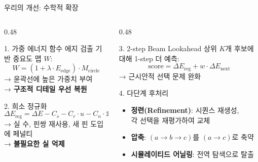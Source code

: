\documentclass[10pt,aspectratio=169]{beamer}
\begin{document}
\begin{frame}{우리의 개선: 수학적 확장}
  \begin{columns}[T]
    \begin{column}{0.48\textwidth}
      \begin{block}{1. 가중 에너지 함수}
        에지 검출 기반 중요도 맵 $W$:
        \[
          W = (1 + \lambda \cdot E_{\text{edge}}) \cdot M_{\text{circle}}
        \]
        → 윤곽선에 높은 가중치 부여\\
        → \textbf{구조적 디테일 우선 복원}
      \end{block}

      \vspace{0.2cm}
      \begin{block}{2. 희소 정규화}
        \[
          \Delta E_{\text{reg}} = \Delta E - C_s - C_r \!\cdot\! u - C_n \!\cdot\! \mathbb{1}_{\text{new}}
        \]
        → 실 수, 핀쌍 재사용, 새 핀 도입에 페널티\\
        → \textbf{불필요한 실 억제}
      \end{block}
    \end{column}
    \begin{column}{0.48\textwidth}
      \begin{block}{3. 2-step Beam Lookahead}
        상위 $K$개 후보에 대해 1-step 더 예측:
        \[
          \text{score} = \Delta E_{\text{reg}} + w \cdot \Delta E_{\text{next}}
        \]
        → 근시안적 선택 문제 완화
      \end{block}

      \vspace{0.2cm}
      \begin{block}{4. 다단계 후처리}
        \begin{itemize}
          \item \textbf{정련(Refinement)}: 시퀀스 재생성,\\
                각 선택을 재평가하여 교체
          \item \textbf{압축}: $(a{\to}b{\to}c)$를 $(a{\to}c)$로 축약
          \item \textbf{시뮬레이티드 어닐링}: 전역 탐색으로 탈출
        \end{itemize}
      \end{block}
    \end{column}
  \end{columns}
\end{frame}
\end{document}
